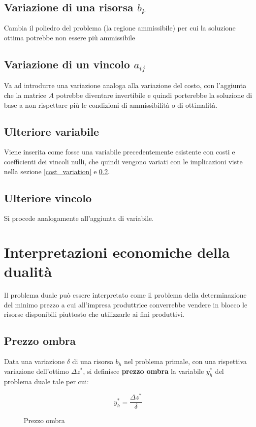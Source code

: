 \documentclass[\main/main.tex]{subfiles}
\begin{document}
\subsection{Variazione di una risorsa $b_k$}
Cambia il poliedro del problema (la regione ammissibile) per cui la soluzione ottima potrebbe non essere più ammissibile

\subsection{Variazione di un vincolo $a_{ij}$} \label{constrain_variation}
Va ad introdurre una variazione analoga alla variazione del costo, con l'aggiunta che la matrice $A$ potrebbe diventare invertibile e quindi porterebbe la soluzione di base a non rispettare più le condizioni di ammissibilità o di ottimalità.

\subsection{Ulteriore variabile}
Viene inserita come fosse una variabile precedentemente esistente con costi e coefficienti dei vincoli nulli, che quindi vengono variati con le implicazioni viste nella sezione \ref{cost_variation} e \ref{constrain_variation}.

\subsection{Ulteriore vincolo}
Si procede analogamente all'aggiunta di variabile.

\section{Interpretazioni economiche della dualità}
Il problema duale può essere interpretato come il problema della determinazione del minimo prezzo a cui all'impresa produttrice converrebbe vendere in blocco le risorse disponibili piuttosto che utilizzarle ai fini produttivi.

\subsection{Prezzo ombra}
\begin{definition}
  Data una variazione $\delta$ di una risorsa $b_h$ nel problema primale, con una rispettiva variazione dell'ottimo $\Delta z^*$, si definisce \textbf{prezzo ombra} la variabile $y^*_h$ del problema duale tale per cui:

  \begin{figure}
    \[
      y^*_h = \frac{\Delta z^*}{\delta}
    \]
    \caption{Prezzo ombra}
  \end{figure}
\end{definition}
\end{document}
